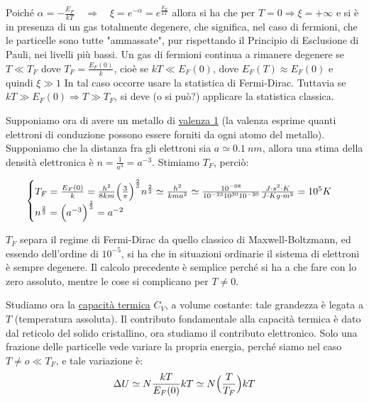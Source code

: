 Poiché $\alpha = -\frac{ E_F}{k T} \quad \Rightarrow \quad \xi = e^{-\alpha} = e^{ \frac{ E_F}{k T}}$ allora si ha che per $T=0 \Rightarrow \xi = +\infty $
e si è in presenza di un gas totalmente degenere, che significa, nel caso di fermioni, che le particelle sono tutte "ammassate", pur rispettando il Principio di Esclusione di Pauli, nei livelli più bassi.
Un gas di fermioni continua a rimanere degenere se $T \ll T_F$ dove $T_F = \frac{ E_F(0)}{k}$, cioè se $kT \ll E_F(0)$, 
dove $E_F(T) \approx E_F(0)$ e quindi $\xi \gg 1$
In tal caso occorre usare la statistica di Fermi-Dirac.
Tuttavia se $kT \gg E_F(0) \Rightarrow T \gg T_F $, si deve (o si può?) applicare la statistica classica.

Supponiamo ora di avere un metallo di \underline{valenza 1} (la valenza esprime quanti elettroni di conduzione possono essere forniti da ogni atomo del metallo).
Supponiamo che la distanza fra gli elettroni sia $a \simeq \SI{0.1}{nm}$, allora una stima della densità elettronica è $n = \frac{ 1}{a^{ 3}} = a^{ -3}$.
Stimiamo $T_F$, perciò:

\begin{equation}
\begin{cases}
	T_F = \frac{ E_F(0)}{k} = \frac{ h^2}{8 k m} \Bigl(  \frac{ 3}{\pi}  \Bigr)^{ \frac{ 2}{3}} n^{ \frac{ 2}{3}} \simeq \frac{ h^2}{k m a^2} \simeq \frac{ 10^{ -68}}{10^{-23 } 10^{ 30} 10^{-20 }} \frac{ J \cdot s^2 \cdot K}{J \cdot Kg \cdot m^2} = 10^{5} K \\
	n^{ \frac{ 2}{3}} = \Bigl(  a^{ -3}  \Bigr)^{ \frac{ 2}{3}} = a^{ -2}
\end{cases}
\end{equation}

$T_F$ separa il regime di Fermi-Dirac da quello classico di Maxwell-Boltzmann, ed essendo dell'ordine di $10^{ -5}$, si ha che in situazioni ordinarie il sistema di elettroni è sempre degenere.
Il calcolo precedente è semplice perché si ha a che fare con lo zero assoluto, mentre le cose si complicano per $T \not = 0 $.

Studiamo ora la \underline{capacità termica} $C_V$, a volume costante: tale grandezza è legata a $T$ (temperatura assoluta).
Il contributo fondamentale alla capacità termica è dato dal reticolo del solido cristallino, ora studiamo il contributo elettronico.
Solo una frazione delle particelle vede variare la propria energia, perché siamo nel caso $T \not = o \ll T_F$, e tale variazione è:
$$ \Delta U \simeq N \frac{ k T}{E_F(0)} kT \simeq N\Bigl(  \frac{ T}{T_F}  \Bigr)kT $$

